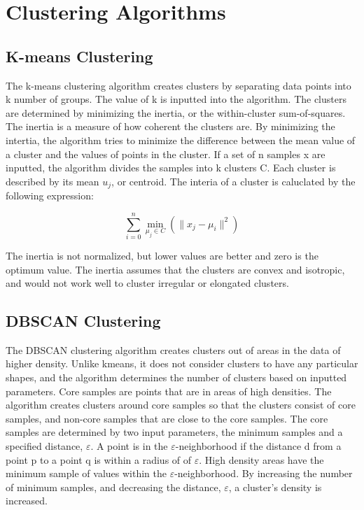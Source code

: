 \documentclass[colorlinks=true,pdfstartview=FitV,linkcolor=blue,
            citecolor=red,urlcolor=magenta]{ligodoc}
\begin{document}
\section{Clustering Algorithms}

\subsection{K-means Clustering}

\indent

\par The k-means clustering algorithm creates clusters by separating data points into k number of groups. The value of k is inputted into the algorithm. The clusters are determined by minimizing the inertia, or the within-cluster sum-of-squares. The inertia is a measure of how coherent the clusters are. By minimizing the intertia, the algorithm tries to minimize the difference between the mean value of a cluster and the values of points in the cluster. If a set of n samples x are inputted, the algorithm divides the samples into k clusters C. Each cluster is described by its mean \(u_j\), or centroid. The interia of a cluster is caluclated by the following expression:

\[\sum_{i=0}^{n} \min_{\mu_j \in  C}(\|x_j-\mu_i\|^2)\]

\par The inertia is not normalized, but lower values are better and zero is the optimum value. The inertia assumes that the clusters are convex and isotropic, and would not work well to cluster irregular or elongated clusters. \cite{Citation2}\cite{Citation3} 

\subsection{DBSCAN Clustering}

\indent

\par The DBSCAN clustering algorithm creates clusters out of areas in the data of higher density. Unlike kmeans, it does not consider clusters to have any particular shapes, and the algorithm determines the number of clusters based on inputted parameters. Core samples are points that are in areas of high densities. The algorithm creates clusters around core samples so that the clusters consist of core samples, and non-core samples that are close to the core samples. The core samples are determined by two input parameters, the minimum samples and a specified distance, $\varepsilon$. A point is in the $\varepsilon$-neighborhood if the distance d from a point p to a point q is within a radius of of $\varepsilon$. High density areas have the minimum sample of values within the $\varepsilon$-neighborhood. By increasing the number of minimum samples, and decreasing the distance, $\varepsilon$, a cluster's density is increased. \cite{Citation2}\cite{Citation4}
\end{document}
